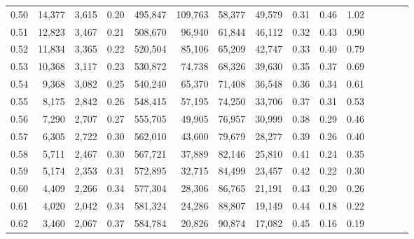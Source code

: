 \begin{tabular}{rrrcrrrrrrrrrrr}
0.50 &  14,377 &  3,615 &                                       0.20 &  495,847 &  109,763 &   58,377 &   49,579 &  0.31 &  0.46 &                         1.02 \\
0.51 &  12,823 &  3,467 &                                       0.21 &  508,670 &   96,940 &   61,844 &   46,112 &  0.32 &  0.43 &                         0.90 \\
0.52 &  11,834 &  3,365 &                                       0.22 &  520,504 &   85,106 &   65,209 &   42,747 &  0.33 &  0.40 &                         0.79 \\
0.53 &  10,368 &  3,117 &                                       0.23 &  530,872 &   74,738 &   68,326 &   39,630 &  0.35 &  0.37 &                         0.69 \\
0.54 &   9,368 &  3,082 &                                       0.25 &  540,240 &   65,370 &   71,408 &   36,548 &  0.36 &  0.34 &                         0.61 \\
0.55 &   8,175 &  2,842 &                                       0.26 &  548,415 &   57,195 &   74,250 &   33,706 &  0.37 &  0.31 &                         0.53 \\
0.56 &   7,290 &  2,707 &                                       0.27 &  555,705 &   49,905 &   76,957 &   30,999 &  0.38 &  0.29 &                         0.46 \\
0.57 &   6,305 &  2,722 &                                       0.30 &  562,010 &   43,600 &   79,679 &   28,277 &  0.39 &  0.26 &                         0.40 \\
0.58 &   5,711 &  2,467 &                                       0.30 &  567,721 &   37,889 &   82,146 &   25,810 &  0.41 &  0.24 &                         0.35 \\
0.59 &   5,174 &  2,353 &                                       0.31 &  572,895 &   32,715 &   84,499 &   23,457 &  0.42 &  0.22 &                         0.30 \\
0.60 &   4,409 &  2,266 &                                       0.34 &  577,304 &   28,306 &   86,765 &   21,191 &  0.43 &  0.20 &                         0.26 \\
0.61 &   4,020 &  2,042 &                                       0.34 &  581,324 &   24,286 &   88,807 &   19,149 &  0.44 &  0.18 &                         0.22 \\
0.62 &   3,460 &  2,067 &                                       0.37 &  584,784 &   20,826 &   90,874 &   17,082 &  0.45 &  0.16 &                         0.19 \\

\end{tabular}
